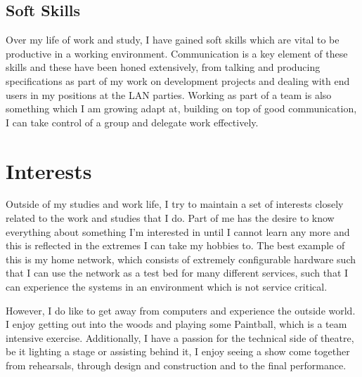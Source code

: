 \documentclass[11pt]{report}
\begin{document}
\subsection*{Soft Skills}
Over my life of work and study, I have gained soft skills which are vital to be productive in a working environment.
Communication is a key element of these skills and these have been honed extensively, from talking and producing specifications as part of my work on development projects and dealing with end users in my positions at the LAN parties.
Working as part of a team is also something which I am growing adapt at, building on top of good communication, I can take control of a group and delegate work effectively.
\section*{Interests}
Outside of my studies and work life, I try to maintain a set of interests closely related to the work and studies that I do.
Part of me has the desire to know everything about something I'm interested in until I cannot learn any more and this is reflected in the extremes I can take my hobbies to.
The best example of this is my home network, which consists of extremely configurable hardware such that I can use the network as a test bed for many different services, such that I can experience the systems in an environment which is not service critical.

However, I do like to get away from computers and experience the outside world. I enjoy getting out into the woods and playing some Paintball, which is a team intensive exercise.
Additionally, I have a passion for the technical side of theatre, be it lighting a stage or assisting behind it, I enjoy seeing a show come together from rehearsals, through design and construction and to the final performance.
\end{document}
